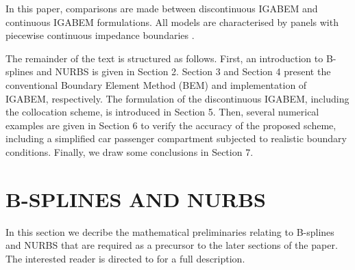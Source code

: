 \documentclass[review]{elsarticle}
\begin{document}
In this paper, 
comparisons
are made between discontinuous IGABEM and continuous IGABEM formulations. All models are characterised by panels with piecewise continuous impedance boundaries \cite{Zayed2007Hearing,guo2015multilayered,1391165,LAGHROUCHE2005367}.

The remainder of the text is structured as follows. First, an introduction to B-splines and NURBS is given in Section 2. Section 3 and Section 4 present the conventional Boundary Element Method (BEM) and implementation of IGABEM, respectively. The formulation of the discontinuous IGABEM, including the collocation scheme, is introduced in Section 5. Then, several numerical examples are given in Section 6 to verify the accuracy of the proposed scheme, including a simplified car passenger compartment subjected to realistic boundary conditions. Finally, we draw some conclusions in Section 7. 

\section{B-SPLINES AND NURBS}

In this section we decribe the mathematical preliminaries relating to B-splines and NURBS that are required as a precursor to the later sections of the paper. The interested reader is directed to \cite{Piegl,Rogers} for a full description.
 
\end{document}
